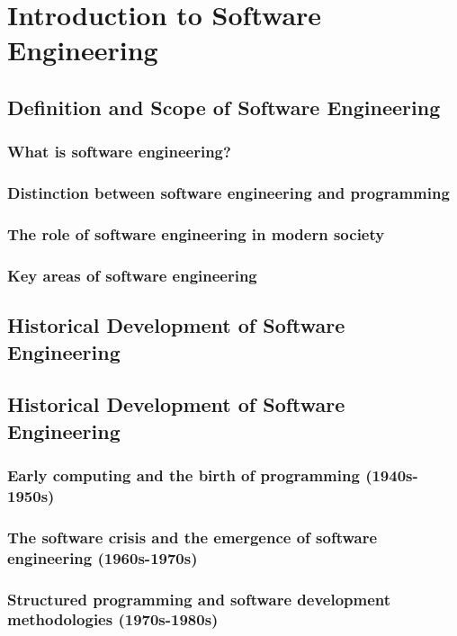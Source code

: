 \chapter{Introduction to Software Engineering}
\begin{refsection}
\section{Definition and Scope of Software Engineering}
\begin{multicols}{2}
{\small
\subsection{What is software engineering?}
\subsection{Distinction between software engineering and programming}
\subsection{The role of software engineering in modern society}
\subsection{Key areas of software engineering}

}
\newpage
\end{multicols}
\section{Historical Development of Software Engineering}
\begin{multicols}{2}
{\small

\section{Historical Development of Software Engineering}
\subsection{Early computing and the birth of programming (1940s-1950s)}
\subsection{The software crisis and the emergence of software engineering (1960s-1970s)}
\subsection{Structured programming and software development methodologies (1970s-1980s)}
}
\end{multicols}
\end{refsection}
